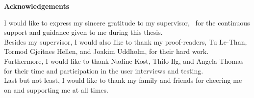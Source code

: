 \noindent \textbf{Acknowledgements}
\thispagestyle{empty}
\vspace*{1cm}

\noindent
I would like to express my sincere gratitude to my supervisor, \firstsupervisor \, for the continuous support and guidance given to me during this thesis.\\

\medskip\noindent
Besides my supervisor, I would also like to thank my proof-readers, Tu Le-Than, Tormod Gjeitnes Hellen, and Joakim Uddholm, for their hard work.\\

\medskip\noindent
Furthermore, I would like to thank Nadine Kost, Thilo Ilg, and Angela Thomas for their time and participation in the user interviews and testing.\\

\medskip\noindent
Last but not least, I would like to thank my family and friends for cheering me on and supporting me at all times.

\addtocounter{page}{-1}